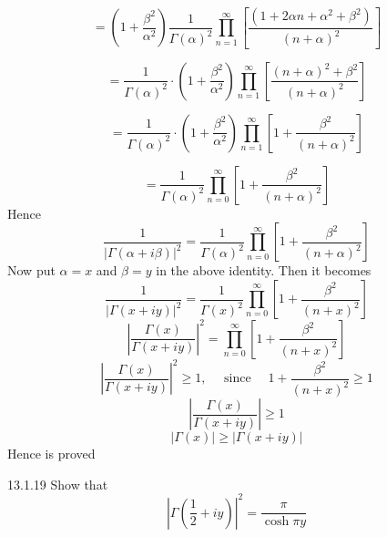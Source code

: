 \documentclass{styles/kaobook}
\begin{document}
$$
=\left(1+\frac{\beta^{2}}{\alpha^{2}}\right) \frac{1}{\Gamma(\alpha)^{2}} \prod_{n=1}^{\infty}\left[\frac{\left(1+2 \alpha n+\alpha^{2}+\beta^{2}\right)}{(n+\alpha)^{2}}\right]
$$

$$
=\frac{1}{\Gamma(\alpha)^{2}} \cdot\left(1+\frac{\beta^{2}}{\alpha^{2}}\right) \prod_{n=1}^{\infty}\left[\frac{(n+\alpha)^{2}+\beta^{2}}{(n+\alpha)^{2}}\right]
$$

$$
=\frac{1}{\Gamma(\alpha)^{2}} \cdot\left(1+\frac{\beta^{2}}{\alpha^{2}}\right) \prod_{n=1}^{\infty}\left[1+\frac{\beta^{2}}{(n+\alpha)^{2}}\right]
$$

$$
=\frac{1}{\Gamma(\alpha)^{2}} \prod_{n=0}^{\infty}\left[1+\frac{\beta^{2}}{(n+\alpha)^{2}}\right]
$$
Hence
$$
\frac{1}{|\Gamma(\alpha+i \beta)|^{2}}=\frac{1}{\Gamma(\alpha)^{2}} \prod_{n=0}^{\infty}\left[1+\frac{\beta^{2}}{(n+\alpha)^{2}}\right]
$$
Now put $\alpha=x$ and $\beta=y$ in the above identity. Then it becomes
$$
\frac{1}{|\Gamma(x+i y)|^{2}}=\frac{1}{\Gamma(x)^{2}} \prod_{n=0}^{\infty}\left[1+\frac{\beta^{2}}{(n+x)^{2}}\right]
$$
$$
\left|\frac{\Gamma(x)}{\Gamma(x+i y)}\right|^{2}=\prod_{n=0}^{\infty}\left[1+\frac{\beta^{2}}{(n+x)^{2}}\right]
$$
$$
\left|\frac{\Gamma(x)}{\Gamma(x+i y)}\right|^{2} \geq 1, \quad \text { since }\quad 1+\frac{\beta^{2}}{(n+x)^{2}} \geq 1
$$
$$\left|\frac{\Gamma(x)}{\Gamma(x+i y)}\right| \geq 1$$
$$|\Gamma(x)| \geq|\Gamma(x+i y)|$$
Hence is proved








\begin{greenbox}{13.1.19}
Show that 
$$\left|\Gamma(\frac{1}{2}+i y)\right|^{2}=\frac{\pi}{\cosh \pi y}$$
\end{greenbox}
\end{document}
